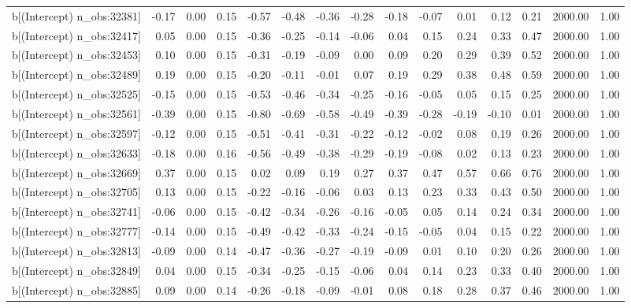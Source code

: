 \begin{table}[ht]
\begin{tabular}{rrrrrrrrrrrrrrr}
  b[(Intercept) n\_obs:32381] & -0.17 & 0.00 & 0.15 & -0.57 & -0.48 & -0.36 & -0.28 & -0.18 & -0.07 & 0.01 & 0.12 & 0.21 & 2000.00 & 1.00 \\ 
  b[(Intercept) n\_obs:32417] & 0.05 & 0.00 & 0.15 & -0.36 & -0.25 & -0.14 & -0.06 & 0.04 & 0.15 & 0.24 & 0.33 & 0.47 & 2000.00 & 1.00 \\ 
  b[(Intercept) n\_obs:32453] & 0.10 & 0.00 & 0.15 & -0.31 & -0.19 & -0.09 & 0.00 & 0.09 & 0.20 & 0.29 & 0.39 & 0.52 & 2000.00 & 1.00 \\ 
  b[(Intercept) n\_obs:32489] & 0.19 & 0.00 & 0.15 & -0.20 & -0.11 & -0.01 & 0.07 & 0.19 & 0.29 & 0.38 & 0.48 & 0.59 & 2000.00 & 1.00 \\ 
  b[(Intercept) n\_obs:32525] & -0.15 & 0.00 & 0.15 & -0.53 & -0.46 & -0.34 & -0.25 & -0.16 & -0.05 & 0.05 & 0.15 & 0.25 & 2000.00 & 1.00 \\ 
  b[(Intercept) n\_obs:32561] & -0.39 & 0.00 & 0.15 & -0.80 & -0.69 & -0.58 & -0.49 & -0.39 & -0.28 & -0.19 & -0.10 & 0.01 & 2000.00 & 1.00 \\ 
  b[(Intercept) n\_obs:32597] & -0.12 & 0.00 & 0.15 & -0.51 & -0.41 & -0.31 & -0.22 & -0.12 & -0.02 & 0.08 & 0.19 & 0.26 & 2000.00 & 1.00 \\ 
  b[(Intercept) n\_obs:32633] & -0.18 & 0.00 & 0.16 & -0.56 & -0.49 & -0.38 & -0.29 & -0.19 & -0.08 & 0.02 & 0.13 & 0.23 & 2000.00 & 1.00 \\ 
  b[(Intercept) n\_obs:32669] & 0.37 & 0.00 & 0.15 & 0.02 & 0.09 & 0.19 & 0.27 & 0.37 & 0.47 & 0.57 & 0.66 & 0.76 & 2000.00 & 1.00 \\ 
  b[(Intercept) n\_obs:32705] & 0.13 & 0.00 & 0.15 & -0.22 & -0.16 & -0.06 & 0.03 & 0.13 & 0.23 & 0.33 & 0.43 & 0.50 & 2000.00 & 1.00 \\ 
  b[(Intercept) n\_obs:32741] & -0.06 & 0.00 & 0.15 & -0.42 & -0.34 & -0.26 & -0.16 & -0.05 & 0.05 & 0.14 & 0.24 & 0.34 & 2000.00 & 1.00 \\ 
  b[(Intercept) n\_obs:32777] & -0.14 & 0.00 & 0.15 & -0.49 & -0.42 & -0.33 & -0.24 & -0.15 & -0.05 & 0.04 & 0.15 & 0.22 & 2000.00 & 1.00 \\ 
  b[(Intercept) n\_obs:32813] & -0.09 & 0.00 & 0.14 & -0.47 & -0.36 & -0.27 & -0.19 & -0.09 & 0.01 & 0.10 & 0.20 & 0.26 & 2000.00 & 1.00 \\ 
  b[(Intercept) n\_obs:32849] & 0.04 & 0.00 & 0.15 & -0.34 & -0.25 & -0.15 & -0.06 & 0.04 & 0.14 & 0.23 & 0.33 & 0.40 & 2000.00 & 1.00 \\ 
  b[(Intercept) n\_obs:32885] & 0.09 & 0.00 & 0.14 & -0.26 & -0.18 & -0.09 & -0.01 & 0.08 & 0.18 & 0.28 & 0.37 & 0.46 & 2000.00 & 1.00 \\ 

\end{tabular}
\end{table}
